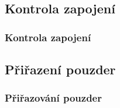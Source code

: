 \documentclass{beamer}
\begin{document}
\subsection{\texorpdfstring{Kontrola zapojení}{Kontrola zapojeni}}
\begin{frame}
	\frametitle{Kontrola zapojení}
		
\end{frame}


\subsection{\texorpdfstring{Přiřazení pouzder}{Prirazeni pouzder}}
\begin{frame}
	\frametitle{Přiřazování pouzder}
		
\end{frame}

  
\end{document}
